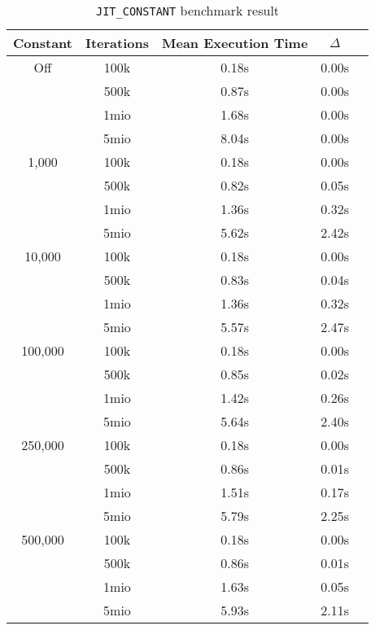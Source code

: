 \begin{table}[H]
    \centering
    \begin{tabular}{c|c|c|c|c}
        Constant & Iterations & Mean Execution Time & $\Delta$ \\ 
        \hline
        Off         & 100k & 0.18s & 0.00s \\
                    & 500k & 0.87s & 0.00s \\
                    & 1mio & 1.68s & 0.00s \\
                    & 5mio & 8.04s & 0.00s \\
        \hline
        1,000       & 100k & 0.18s & 0.00s \\
                    & 500k & 0.82s & 0.05s \\
                    & 1mio & 1.36s & 0.32s \\
                    & 5mio & 5.62s & 2.42s \\
        \hline
        10,000      & 100k & 0.18s & 0.00s \\
                    & 500k & 0.83s & 0.04s \\
                    & 1mio & 1.36s & 0.32s \\
                    & 5mio & 5.57s & 2.47s \\
        \hline
        100,000     & 100k & 0.18s & 0.00s \\
                    & 500k & 0.85s & 0.02s \\
                    & 1mio & 1.42s & 0.26s \\
                    & 5mio & 5.64s & 2.40s \\
        \hline
        250,000     & 100k & 0.18s & 0.00s \\
                    & 500k & 0.86s & 0.01s \\
                    & 1mio & 1.51s & 0.17s \\
                    & 5mio & 5.79s & 2.25s \\
        \hline
        500,000     & 100k & 0.18s & 0.00s \\
                    & 500k & 0.86s & 0.01s \\
                    & 1mio & 1.63s & 0.05s \\
                    & 5mio & 5.93s & 2.11s \\
    \end{tabular}
    \label{table:benchmark-realworld-jit}
    \caption{\texttt{JIT\_CONSTANT} benchmark result}
\end{table}

